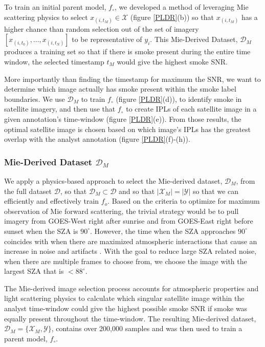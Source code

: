 \documentclass{article}
\begin{document}
To train an initial parent model, \(f_{\circ}\), we developed a method of leveraging Mie scattering physics to select \(x_{(i,t_M)} \in \mathcal{X}\) (figure \ref{PLDR}(b)) so that \(x_{(i,t_M)}\) has a higher chance than random selection out of the set of imagery \([x_{(i,t_0)},...,x_{(i,t_N)}]\) to be representative of \(y_i\). This Mie-Derived Dataset, \(\mathcal{D}_M\) produces a training set so that if there is smoke present during the entire time window, the selected timestamp \(t_M\) would give the highest smoke SNR. 

More importantly than finding the timestamp for maximum the SNR, we want to determine which image actually has smoke present within the smoke label boundaries. We use \(\mathcal{D}_M\) to train \(f_{\circ}\) (figure \ref{PLDR}(d)), to identify smoke in satellite imagery, and then use that \(f_{\circ}\) to create IPLs of each satellite image in a given annotation's time-window (figure \ref{PLDR}(e)). From those results, the optimal satellite image is chosen based on which image's IPLs has the greatest overlap with the analyst annotation (figure \ref{PLDR}(f)-(h)).


\subsubsection{Mie-Derived Dataset \(\mathcal{D}_M\)}

We apply a physics-based approach to select the Mie-derived dataset, \(\mathcal{D}_M\), from the full dataset \(\mathcal{D}\), so that \(\mathcal{D}_M \subset \mathcal{D}\) and so that \(|\mathcal{X}_M|=|\mathcal{Y}|\) so that we can efficiently and effectively train \(f_o\). Based on the criteria to optimize for maximum observation of Mie forward scattering, the trivial strategy would be to pull imagery from GOES-West right after sunrise and from GOES-East right before sunset when the SZA is \(90^{\circ}\). However, the time when the SZA approaches \(90^{\circ}\) coincides with when there are maximized atmospheric interactions that cause an increase in noise and artifacts \cite{zen_angle}. With the goal to reduce large SZA related noise, when there are multiple frames to choose from, we choose the image with the largest SZA that is \(<88^{\circ}\).

The Mie-derived image selection process accounts for atmospheric properties and light scattering physics to calculate which singular satellite image within the analyst time-window could give the highest possible smoke SNR if smoke was equally present throughout the time-window. The resulting Mie-derived dataset, \(\mathcal{D}_M = \{\mathcal{X}_M, \mathcal{Y}\}\), contains over 200,000 samples and was then used to train a parent model, \(f_{\circ}\). 
\end{document}
